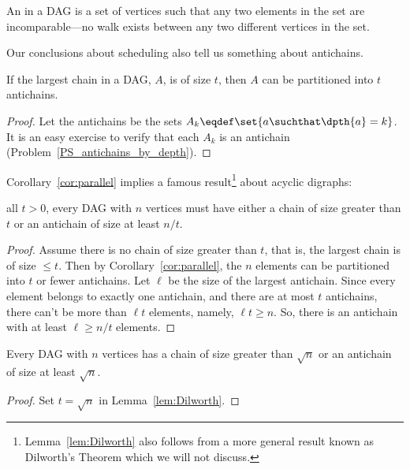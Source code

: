 \begin{definition}
\begin{definition}
An  in a DAG is a set of vertices such that any two
elements in the set are incomparable---no walk exists between any two
different vertices in the set.
\end{definition}

Our conclusions about scheduling also tell us something about antichains.

\begin{corollary}\label{cor:parallel}
If the largest chain in a DAG, $A$, is of size $t$,
then $A$ can be partitioned into $t$ antichains.
\end{corollary}

\begin{proof}
Let the antichains be the sets $A_k \eqdef \set{a \suchthat \dpth{a}
  =k}$.
It is an easy exercise to verify that each $A_k$ is an antichain
(Problem~\ref{PS_antichains_by_depth}).
\end{proof}

Corollary~\ref{cor:parallel} implies a famous
result\footnote{Lemma~\ref{lem:Dilworth} also follows from a more
  general result known as Dilworth's Theorem which we will not
  discuss.} about acyclic digraphs:

\begin{lemma}[Dilworth]\label{lem:Dilworth}
 all $t>0$, every DAG with
$n$ vertices must have either a chain of size greater than $t$ or an
antichain of size at least $n / t$.
\end{lemma}

\begin{proof}
Assume there is no chain of size greater than $t$, that is, the
largest chain is of size $\le t$.  Then by
Corollary~\ref{cor:parallel}, the $n$ elements can be partitioned into
$t$ or fewer antichains.  Let $\ell$ be the size of the largest
antichain.  Since every element belongs to exactly one antichain, and
there are at most $t$ antichains, there can't be more than $\ell t$
elements, namely, $\ell t \geq n$.  So, there is an antichain with at
least $\ell \geq n / t$ elements.
\end{proof}

\begin{corollary}\label{cor:Dilworth}
Every DAG with $n$ vertices has a chain of size greater
than $\sqrt{n}$ or an antichain of size at least $\sqrt{n}$.

\begin{proof}
  Set $t = \sqrt{n}$ in Lemma~\ref{lem:Dilworth}.
\end{proof}
\end{corollary}


\end{definition}
